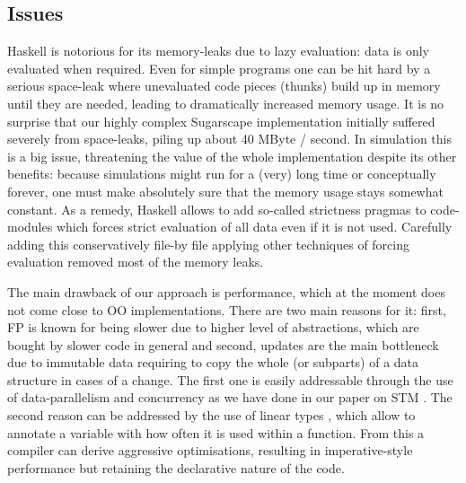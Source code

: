 \subsection{Issues}
Haskell is notorious for its memory-leaks due to lazy evaluation: data is only evaluated when required. Even for simple programs one can be hit hard by a serious space-leak where unevaluated code pieces (thunks) build up in memory until they are needed, leading to dramatically increased memory usage. It is no surprise that our highly complex Sugarscape implementation initially suffered severely from space-leaks, piling up about 40 MByte / second. In simulation this is a big issue, threatening the value of the whole implementation despite its other benefits: because simulations might run for a (very) long time or conceptually forever, one must make absolutely sure that the memory usage stays somewhat constant. As a remedy, Haskell allows to add so-called strictness pragmas to code-modules which forces strict evaluation of all data even if it is not used. Carefully adding this conservatively file-by file applying other techniques of forcing evaluation removed most of the memory leaks.


The main drawback of our approach is performance, which at the moment does not come close to OO implementations. There are two main reasons for it: first, FP is known for being slower due to higher level of abstractions, which are bought by slower code in general and second, updates are the main bottleneck due to immutable data requiring to copy the whole (or subparts) of a data structure in cases of a change. The first one is easily addressable through the use of data-parallelism and concurrency as we have done in our paper on STM \cite{thaler_tale_2018}. The second reason can be addressed by the use of linear types \cite{bernardy_linear_2017}, which allow to annotate a variable with how often it is used within a function. From this a compiler can derive aggressive optimisations, resulting in imperative-style performance but retaining the declarative nature of the code.